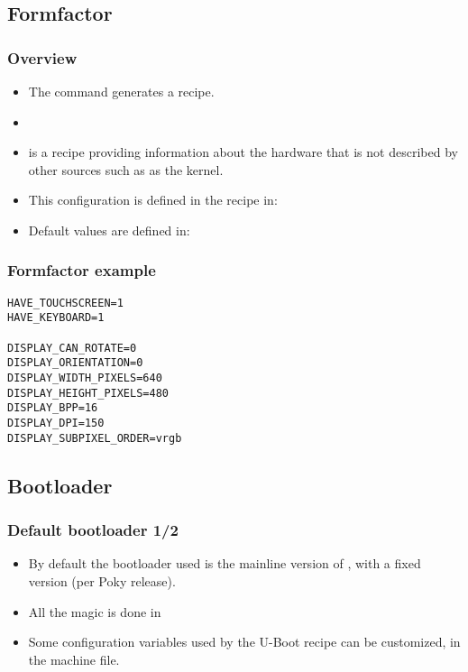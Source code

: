\subsection{Formfactor}

\begin{frame}
  \frametitle{Overview}
  \begin{itemize}
    \item The  command generates a  recipe.
    \item {}
    \item {} is a recipe providing information
      about the hardware that is not described by other sources such as
      as the kernel.
    \item This configuration is defined in the recipe in:
    \item Default values are defined in:
  \end{itemize}
\end{frame}

\begin{frame}[fragile]
  \frametitle{Formfactor example}
  \begin{block}{}
    \begin{verbatim}
HAVE_TOUCHSCREEN=1
HAVE_KEYBOARD=1

DISPLAY_CAN_ROTATE=0
DISPLAY_ORIENTATION=0
DISPLAY_WIDTH_PIXELS=640
DISPLAY_HEIGHT_PIXELS=480
DISPLAY_BPP=16
DISPLAY_DPI=150
DISPLAY_SUBPIXEL_ORDER=vrgb 
    \end{verbatim}
  \end{block}
\end{frame}

\subsection{Bootloader}

\begin{frame}
  \frametitle{Default bootloader 1/2}
  \begin{itemize}
    \item By default the bootloader used is the mainline version of
      , with a fixed version (per Poky release).
    \item All the magic is done in
    \item Some configuration variables used by the U-Boot recipe can
      be customized, in the machine file.
  \end{itemize}
\end{frame}

